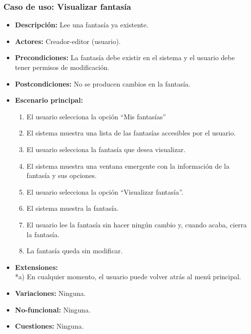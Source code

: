\subsubsection{Caso de uso: Visualizar fantasía}
\begin{itemize}
	\item \textbf{Descripción:} Lee una fantasía ya existente.
	\item \textbf{Actores:} Creador-editor (usuario).
	\item \textbf{Precondiciones:} La fantasía debe existir en el sistema y el usuario debe tener permisos de modificación.
	\item \textbf{Postcondiciones:} No se producen cambios en la fantasía.
	\item \textbf{Escenario principal:}
	\begin{enumerate}
		\item El usuario selecciona la opción ``Mis fantasías''
		\item El sistema muestra una lista de las fantasías accesibles por el usuario.
		\item El usuario selecciona la fantasía que desea visualizar.
		\item El sistema muestra una ventana emergente con la información de la fantasía y sus opciones.
		\item El usuario selecciona la opción ``Visualizar fantasía''.
		\item El sistema muestra la fantasía.
		\item El usuario lee la fantasía sin hacer ningún cambio y, cuando acaba, cierra la fantasía.
		\item La fantasía queda sin modificar.
	\end{enumerate}
	\item \textbf{Extensiones:} \\ *a) En cualquier momento, el usuario puede volver atrás al menú principal.
	\item \textbf{Variaciones:} Ninguna.
	\item \textbf{No-funcional:} Ninguna.
	\item \textbf{Cuestiones:} Ninguna.
\end{itemize}

